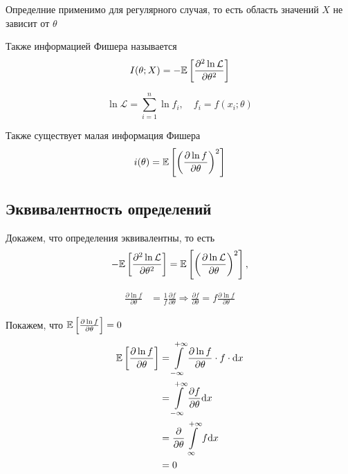\documentclass[a4paper, 10pt]{article}
\begin{document}
\comment Определние применимо для регулярного случая, то есть область значений $X$ не зависит от $\theta$

 Также информацией Фишера называется
\begin{equation*}
    I(\theta;X)=-\mathbb{E}\left[\frac{\partial^2\ln\mathcal{L}}{\partial\theta^2}\right]
\end{equation*}

\begin{equation*}
    \ln\mathcal{L}=\sum_{i=1}^{n}\ln f_i,\quad f_i=f(x_i;\theta)
\end{equation*}

Также существует малая информация Фишера
\begin{equation*}
    i(\theta)=\mathbb{E}\left[\left(\frac{\partial \ln f}{\partial\theta}\right)^2\right]
\end{equation*}

\subsection{Эквивалентность определений}
Докажем, что определения эквивалентны, то есть 
\begin{equation*}
    -\mathbb{E}\left[\frac{\partial^2\ln\mathcal{L}}{\partial\theta^2}\right]=\mathbb{E}\left[\left(\frac{\partial \ln\mathcal{L}}{\partial\theta}\right)^2\right],
\end{equation*}

\begin{equation*}
    \begin{aligned}
        \frac{\partial\ln f}{\partial\theta}&=\frac{1}{f}\frac{\partial f}{\partial\theta}\Longrightarrow\frac{\partial f}{\partial \theta}=f\frac{\partial \ln f}{\partial\theta}
    \end{aligned}
\end{equation*}

Покажем, что $\mathbb{E}\left[\frac{\partial \ln f}{\partial\theta}\right]=0$
\begin{equation*}
    \begin{aligned}
        \mathbb{E}\left[\frac{\partial \ln f}{\partial\theta}\right]&=\int\limits_{-\infty}^{+\infty}\frac{\partial\ln f}{\partial \theta}\cdot f\cdot \text{d}x\\
        &=\int\limits_{-\infty}^{+\infty}\frac{\partial f}{\partial \theta}\text{d}x\\
        &=\frac{\partial}{\partial\theta}\int\limits_{\infty}^{+\infty}f\text{d}x\\
        &=0
    \end{aligned}
\end{equation*}
\end{document}
